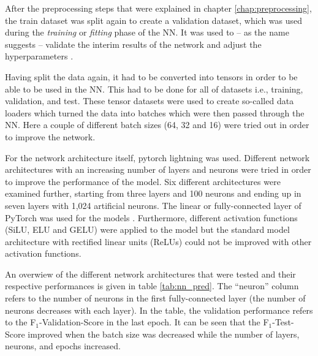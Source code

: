 After the preprocessing steps that were explained in chapter \ref{chap:preprocessing}, the train dataset was split again to create a validation dataset, which was used during the \textit{training} or \textit{fitting} phase of the NN. It was used to -- as the name suggests -- validate the interim results of the network and adjust the hyperparameters \citep[][p. 184]{TanPang-Ning2006}.

Having split the data again, it had to be converted into tensors in order to be able to be used in the NN. This had to be done for all of datasets i.e., training, validation, and test. These tensor datasets were used to create so-called data loaders which turned the data into batches which were then passed through the NN. Here a couple of different batch sizes (64, 32 and 16) were tried out in order to improve the network.

For the network architecture itself, pytorch lightning was used. Different network architectures with an increasing number of layers and neurons were tried in order to improve the performance of the model. Six different architectures were examined further, starting from three layers and 100 neurons and ending up in seven layers with 1,024 artificial neurons. The linear or fully-connected layer of PyTorch was used for the models \citep{PyTorch2019, PyTorch2021}. Furthermore, different activation functions (SiLU, ELU and GELU) were applied to the model but the standard model architecture with rectified linear units (ReLUs) could not be improved with other activation functions.

An overwiew of the different network architectures that were tested and their respective performances is given in table \ref{tab:nn_pred}. The \enquote{neuron} column refers to the number of neurons in the first fully-connected layer (the number of neurons decreases with each layer). In the table, the validation performance refers to the F$_1$-Validation-Score in the last epoch. It can be seen that the F$_1$-Test-Score improved when the batch size was decreased while the number of layers, neurons, and epochs increased.